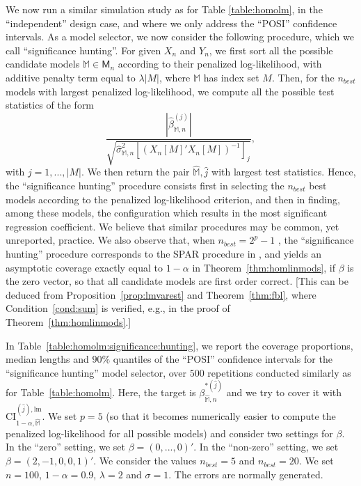 \documentclass[preprint]{imsart}
\newcommand{\M}{\mathbb M}
\numberwithin{equation}{section}
\begin{document}
We now run a similar simulation study as for Table \ref{table:homolm}, in the ``independent'' design case, and where we only address the ``POSI'' confidence intervals. As a model selector, we now consider the following procedure, which we call ``significance hunting''. For given $X_n$ and $Y_n$, we first sort all the possible candidate models $\mathbb{M}\in\mathsf M_n$ according to their penalized log-likelihood, with additive penalty term equal to $\lambda |M|$, where $\mathbb{M}$ has index set $M$. Then, for the $n_{best}$ models with largest penalized log-likelihood, we compute all the possible test statistics of the form 
\[
\frac{
\left| \hat{\beta}^{(j)}_{\mathbb{M},n} \right|
}{
  \sqrt{\hat{\sigma}^2_{\mathbb{M},n} \left[\left( X_n[M]'X_n[M]  \right)^{-1}\right]_j}
},
\]
with $j =1,...,|M|$. We then return the pair $\hat{\mathbb{M}},\hat{j}$ with largest test statistics. Hence, the ``significance hunting'' procedure consists first in selecting the $n_{best}$ best models according to the penalized log-likelihood criterion, and then in finding, among these models, the configuration which results in the most significant regression coefficient. We believe that similar procedures may be common, yet unreported, practice. We also observe that, when $n_{best} = 2^p - 1$ , the ``significance hunting'' procedure corresponds to the SPAR procedure in \cite{Berk13}, and yields an asymptotic coverage exactly equal to $1-\alpha$ in Theorem~\ref{thm:homlinmods}, if $\beta$ is the zero vector, so that all candidate models are first order correct. [This can be deduced from Proposition~\ref{prop:lmvarest} and Theorem~\ref{thm:fbl}, where Condition~\ref{cond:sum} is verified, e.g., in the proof of Theorem~\ref{thm:homlinmods}.]

In Table~\ref{table:homolm:significance:hunting}, we report the coverage proportions, median lengths and $90 \%$ quantiles of the ``POSI'' confidence intervals for the ``significance hunting'' model selector, over $500$ repetitions conducted similarly as for Table~\ref{table:homolm}. Here, the target is $\beta_{\hat{\M},n}^{*(\hat{j})}$ and we try to cover it with $\mathrm{CI}_{1-\alpha, \hat{\mathbb{M}}}^{(\hat{j}), \mathrm{lm}}$. We set $p=5$ (so that it becomes numerically easier to compute the penalized log-likelihood for all possible models) and consider two settings for $\beta$. In the ``zero'' setting, we set $\beta = (0,...,0)'$. In the ``non-zero'' setting, we set $\beta = (2,-1,0,0,1)'$. We consider the values $n_{best}=5$ and $n_{best} = 20$.
We set $n=100$, $1-\alpha=0.9$, $\lambda=2$ and $\sigma=1$. The errors are normally generated.
\end{document}
